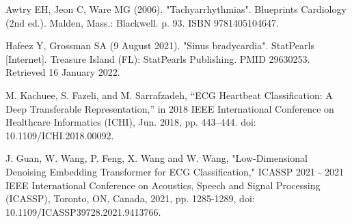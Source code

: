 \documentclass[conference]{IEEEtran}
\begin{document}
	\begin{thebibliography}{9}
	 Awtry EH, Jeon C, Ware MG (2006). "Tachyarrhythmias". Blueprints Cardiology (2nd ed.). Malden, Mass.: Blackwell. p. 93. ISBN 9781405104647.
	
	 Hafeez Y, Grossman SA (9 August 2021). "Sinus bradycardia". StatPearls [Internet]. Treasure Island (FL): StatPearls Publishing. PMID 29630253. Retrieved 16 January 2022.
		
	 M. Kachuee, S. Fazeli, and M. Sarrafzadeh, “ECG Heartbeat Classification: A Deep Transferable Representation,” in 2018 IEEE International Conference on Healthcare Informatics (ICHI), Jun. 2018, pp. 443–444. doi: 10.1109/ICHI.2018.00092.
	
	 J. Guan, W. Wang, P. Feng, X. Wang and W. Wang, "Low-Dimensional Denoising Embedding Transformer for ECG Classification," ICASSP 2021 - 2021 IEEE International Conference on Acoustics, Speech and Signal Processing (ICASSP), Toronto, ON, Canada, 2021, pp. 1285-1289, doi: 10.1109/ICASSP39728.2021.9413766. 
	
	

	\end{thebibliography}
	
  
  
\end{document}
